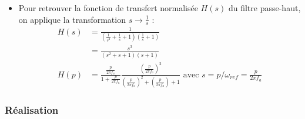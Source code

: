\documentclass[../../Cours_M1.tex]{subfiles}
\begin{document}
\begin{itemize}
\item Pour retrouver la fonction de transfert normalisée $H(s)$ du filtre passe-haut, on applique la transformation $s \rightarrow \frac{1}{s}$ :
\begin{align*}
H(s) & = \frac{1}{(\frac{1}{s^2} + \frac{1}{s} +1)(\frac{1}{s}+1)} \\
& = \frac{s^3}{(s^2 + s + 1)(s+1)} \\
H(p) & = \frac{\frac{p}{2\pi f_a}}{1+\frac{p}{2\pi f_a}} \frac{(\frac{p}{2\pi f_a})^2}{(\frac{p}{2\pi f_a})^2+(\frac{p}{2\pi f_a})+1} \text{ avec } s = p/\omega_{ref} = \frac{p}{2\pi f_a}
\end{align*}
\end{itemize}

\subsubsection*{Réalisation}
\end{document}

